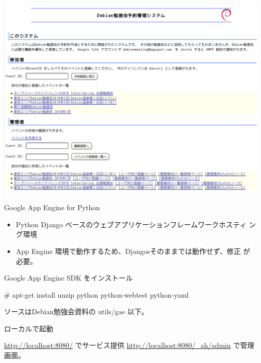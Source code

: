 \begin{frame}{}

\includegraphics[width=1\hsize]{image201002/debianmeeting-screenshot.png}

\end{frame}

\begin{frame}{Google App Engine for Python}
\begin{itemize}
 \item Python Django ベースのウェブアプリケーションフレームワークホスティ
       ング環境
 \item App Engine 環境で動作するため、Djangosそのままでは動作せず、修正
       が必要。
\end{itemize}
\end{frame}

\begin{frame}[containsverbatim]{Google App Engine SDK をインストール}
\begin{commandline}
 # apt-get install unzip python python-webtest python-yaml
\end{commandline}

ソースはDebian勉強会資料の utils/gae 以下。

\end{frame}

\begin{frame}[containsverbatim]{ローカルで起動}

\url{http://localhost:8080/} でサービス提供
\url{http://localhost:8080/_ah/admin} で管理画面。

\end{frame}

